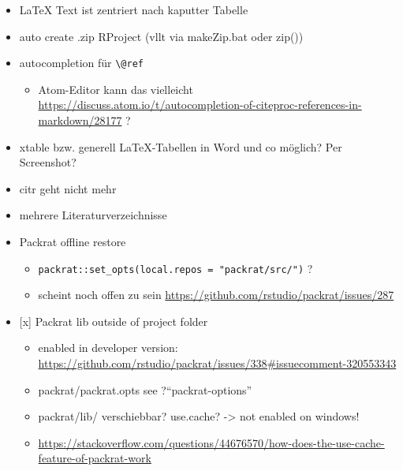 \documentclass[]{book}
\providecommand{\tightlist}{%
  \setlength{\itemsep}{0pt}\setlength{\parskip}{0pt}}
\theoremstyle{definition}
\theoremstyle{definition}
\theoremstyle{remark}
\begin{document}
\begin{itemize}
\tightlist
\item
  LaTeX Text ist zentriert nach kaputter Tabelle
\item
  auto create .zip RProject (vllt via makeZip.bat oder zip())
\item
  autocompletion für \texttt{\textbackslash{}@ref}

  \begin{itemize}
  \tightlist
  \item
    Atom-Editor kann das vielleicht
    \url{https://discuss.atom.io/t/autocompletion-of-citeproc-references-in-markdown/28177}
    ?
  \end{itemize}
\item
  xtable bzw. generell LaTeX-Tabellen in Word und co möglich? Per
  Screenshot?
\item
  citr geht nicht mehr
\item
  mehrere Literaturverzeichnisse
\item
  Packrat offline restore

  \begin{itemize}
  \tightlist
  \item
    \texttt{packrat::set\_opts(local.repos\ =\ "packrat/src/")} ?
  \item
    scheint noch offen zu sein
    \url{https://github.com/rstudio/packrat/issues/287}
  \end{itemize}
\item
  {[}x{]} Packrat lib outside of project folder

  \begin{itemize}
  \tightlist
  \item
    enabled in developer version:
    \url{https://github.com/rstudio/packrat/issues/338\#issuecomment-320553343}
  \item
    packrat/packrat.opts see ?``packrat-options''
  \item
    packrat/lib/ verschiebbar? use.cache? -\textgreater{} not enabled on
    windows!
  \item
    \url{https://stackoverflow.com/questions/44676570/how-does-the-use-cache-feature-of-packrat-work}


\end{itemize}
\end{itemize}
\end{document}
